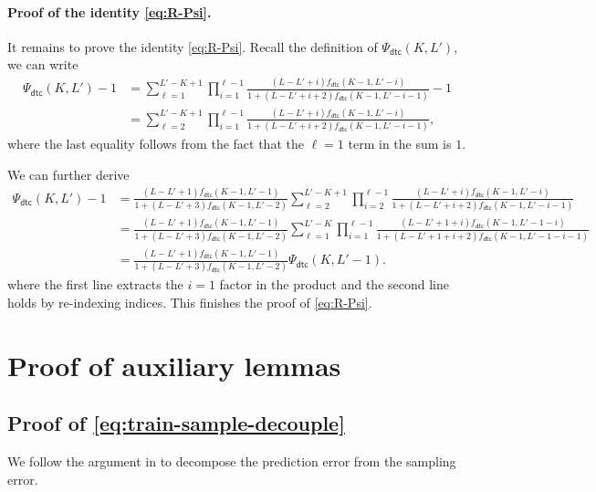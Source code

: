\documentclass[english]{article}
\newcommand{\dtc}{\mathsf{dtc}}
\begin{document}
\paragraph{Proof of the identity \eqref{eq:R-Psi}.}
It remains to prove the identity \eqref{eq:R-Psi}.
Recall the definition of $\Psi_\dtc(K, L')$, we can write
\begin{align*}
\Psi_\dtc(K, L') - 1 &= \sum_{\ell=1}^{L'-K+1} \prod_{i=1}^{\ell-1} \frac{(L-L'+i)f_\dtc(K-1, L' - i)}{1 + (L-L'+i+2)f_\dtc(K-1, L' - i - 1)} - 1 \\ 
& =   \sum_{\ell=2}^{L'-K+1} \prod_{i=1}^{\ell-1} \frac{(L-L'+i)f_\dtc(K-1, L' - i)}{1 + (L-L'+i+2)f_\dtc(K-1, L' - i - 1)},
\end{align*} 
where the last equality follows from the fact that the $\ell = 1$ term in the sum is $1$.

We can further derive
\begin{align*}
    \Psi_\dtc(K, L') - 1 
    &= \frac{(L-L'+1)f_\dtc(K-1, L'-1)}{1 + (L-L'+3)f_\dtc(K-1, L'-2)} \sum_{\ell=2}^{L'-K+1} \prod_{i=2}^{\ell-1} \frac{(L-L'+i)f_\dtc(K-1, L' - i)}{1 + (L-L'+i+2)f_\dtc(K-1, L' - i - 1)} \\ 
    &= \frac{(L-L'+1)f_\dtc(K-1, L'-1)}{1 + (L-L'+3)f_\dtc(K-1, L'-2)} \sum_{\ell=1}^{L'-K} \prod_{i=1}^{\ell-1} \frac{(L-L'+1+i)f_\dtc(K-1, L' - 1 - i)}{1 + (L-L'+1+i+2)f_\dtc(K - 1, L' - 1 - i - 1)} \\
    &= \frac{(L-L'+1)f_\dtc(K-1, L'-1)}{1 + (L-L'+3)f_\dtc(K-1, L'-2)} \Psi_\dtc(K, L'-1).
\end{align*}
where the first line extracts the $i = 1$ factor in the product and the second line holds by re-indexing indices.
This finishes the proof of \eqref{eq:R-Psi}.

\section{Proof of auxiliary lemmas}
\subsection{Proof of \eqref{eq:train-sample-decouple}}
\label{sec:proof-train-sample-decouple}
We follow the argument in \citep{li2025breaking} to decompose the prediction error from the sampling error. 
\end{document}
